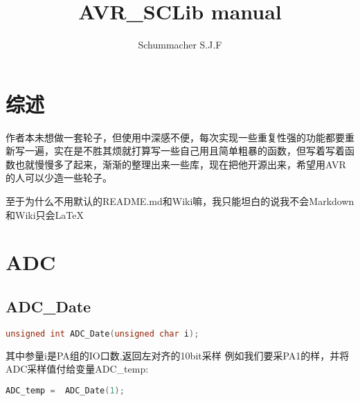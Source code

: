 \documentclass{paper}
\title{AVR\_SCLib manual}
\begin{document}
\author{Schummacher S.J.F}
\maketitle
\newpage
\tableofcontents
\newpage
\section{综述}
作者本未想做一套轮子，但使用中深感不便，每次实现一些重复性强的功能都要重新写一遍，实在是不胜其烦就打算写一些自己用且简单粗暴的函数，但写着写着函数也就慢慢多了起来，渐渐的整理出来一些库，现在把他开源出来，希望用AVR的人可以少造一些轮子。\par
至于为什么不用默认的README.md和Wiki嘛，我只能坦白的说我不会Markdown和Wiki只会\LaTeX
\section{ADC}
\subsection{ADC\_Date}
\begin{lstlisting}[language=C]
unsigned int ADC_Date(unsigned char i);
\end{lstlisting}
其中参量i是PA组的IO口数,返回左对齐的10bit采样\newline\newline
例如我们要采PA1的样，并将ADC采样值付给变量ADC\_temp:
\begin{lstlisting}[language=C]
ADC_temp =  ADC_Date(1);
\end{lstlisting}
\end{document}
